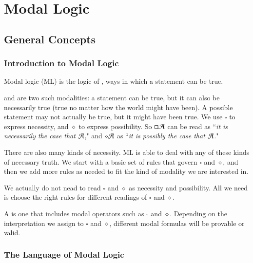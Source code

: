 \documentclass[12pt, a4paper, oneside, openright, titlepage]{book}
\begin{document}
\part{Modal Logic}

\chapter{\textsection\textsection General Concepts}

\section{\textsection Introduction to Modal Logic}

Modal logic (ML) is the logic of , ways in which a statement can be true.

\begin{eg}
     and  are two such modalities: a statement can be true, but it can also be necessarily true (true no matter how the world might have been). A possible statement may not actually be true, but it might have been true. We use $\square$ to express necessity, and $\diamond$ to express possibility. So $\square\mathcal{A}$ can be read as ``\emph{it is necessarily the case that $\mathcal{A}$}," and $\diamond\mathcal{A}$ as ``\emph{it is possibly the case that $\mathcal{A}$}."
\end{eg}

There are also many kinds of necessity. ML is able to deal with any of these kinds of necessary truth. We start with a basic set of rules that govern $\square$ and $\diamond$, and then we add more rules as needed to fit the kind of modality we are interested in. 


We actually do not nead to read $\square$ and $\diamond$ as necessity and possibility. All we need is choose the right rules for different readings of $\square$ and $\diamond$.

\begin{defn}
    A  is one that includes modal operators such as $\square$ and $\diamond$. Depending on the interpretation we assign to $\square$ and $\diamond$, different modal formulas will be provable or valid.
\end{defn}


\section{\textsection The Language of Modal Logic}
\end{document}
